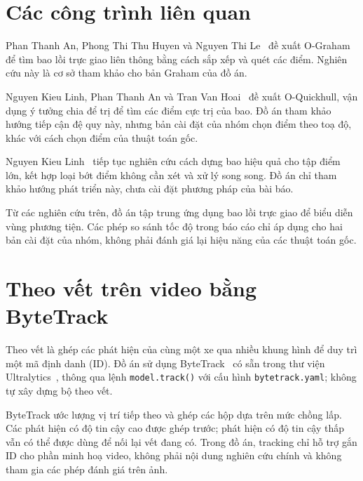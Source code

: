 \section{Các công trình liên quan}
\label{sec:related}

Phan Thanh An, Phong Thi Thu Huyen và Nguyen Thi Le~\cite{an2021ograham} đề xuất O-Graham để tìm bao lồi trực giao liên thông bằng cách sắp xếp và quét các điểm. Nghiên cứu này là cơ sở tham khảo cho bản Graham của đồ án.

Nguyen Kieu Linh, Phan Thanh An và Tran Van Hoai~\cite{nguyen2022quickhull} đề xuất O-Quickhull, vận dụng ý tưởng chia để trị để tìm các điểm cực trị của bao. Đồ án tham khảo hướng tiếp cận đệ quy này, nhưng bản cài đặt của nhóm chọn điểm theo toạ độ, khác với cách chọn điểm của thuật toán gốc.

Nguyen Kieu Linh~\cite{linh2025parallel} tiếp tục nghiên cứu cách dựng bao hiệu quả cho tập điểm lớn, kết hợp loại bớt điểm không cần xét và xử lý song song. Đồ án chỉ tham khảo hướng phát triển này, chưa cài đặt phương pháp của bài báo.

Từ các nghiên cứu trên, đồ án tập trung ứng dụng bao lồi trực giao để biểu diễn vùng phương tiện. Các phép so sánh tốc độ trong báo cáo chỉ áp dụng cho hai bản cài đặt của nhóm, không phải đánh giá lại hiệu năng của các thuật toán gốc.

\section{Theo vết trên video bằng ByteTrack}
\label{sec:tracker}

Theo vết là ghép các phát hiện của cùng một xe qua nhiều khung hình để duy trì một mã định danh (ID). Đồ án sử dụng ByteTrack~\cite{zhang2022bytetrack} có sẵn trong thư viện Ultralytics~\cite{yolo11}, thông qua lệnh \texttt{model.track()} với cấu hình \texttt{bytetrack.yaml}; không tự xây dựng bộ theo vết.

ByteTrack ước lượng vị trí tiếp theo và ghép các hộp dựa trên mức chồng lấp. Các phát hiện có độ tin cậy cao được ghép trước; phát hiện có độ tin cậy thấp vẫn có thể được dùng để nối lại vết đang có. Trong đồ án, tracking chỉ hỗ trợ gắn ID cho phần minh hoạ video, không phải nội dung nghiên cứu chính và không tham gia các phép đánh giá trên ảnh.

